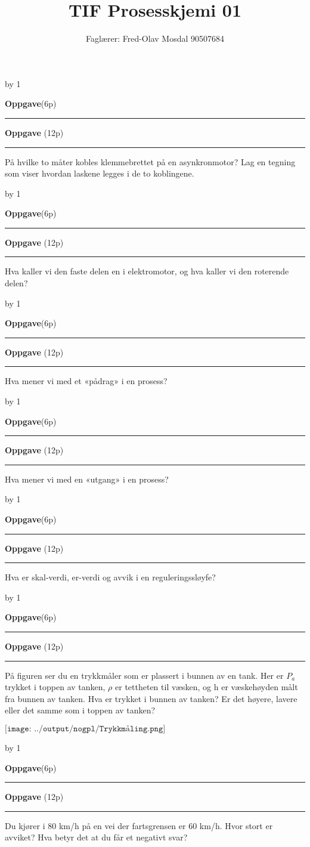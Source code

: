 \documentclass[12pt,a4paper]{article}
\def\oppgave{
            \advance\questnum by 1
	    \ifthenelse{\questnum>0\AND \questnum<9}
	    {
                \vskip 1cm
		\textbf{Oppgave}\hskip 5pt\the\questnum \hfill \hfill(6p)
		\vskip 3pt
		\hrule
	\vskip 0.5cm}
	{
                \vskip 1cm
		\textbf{Oppgave}\hskip 5pt \the\questnum \hfill \hfill(12p)
		\vskip 3pt \hrule \vskip 0.5cm }

		}
\begin{document}
\title{TIF Prosesskjemi 01}
\author{Faglærer: Fred-Olav Mosdal 90507684\\}
\maketitle
\oppgave{}%
\vskip 2.5pt 
På hvilke to måter kobles klemmebrettet på en asynkronmotor? Lag en tegning som viser hvordan laskene legges i de to koblingene. 
\vskip 5pt 
\vskip 2.5pt 

\oppgave{}%
\vskip 2.5pt 
Hva kaller vi den faste delen en i elektromotor, og hva kaller vi den roterende delen?
\vskip 5pt 
\vskip 2.5pt 
\newpage
\oppgave{}%
\vskip 2.5pt 
Hva mener vi med et «pådrag» i en prosess?
\vskip 5pt 
\vskip 2.5pt 
\oppgave{}%
\vskip 2.5pt 
Hva mener vi med en «utgang» i en prosess?
\vskip 5pt 
\vskip 2.5pt 
\newpage
\oppgave{}%
\vskip 2.5pt 
Hva er skal-verdi, er-verdi og avvik i en reguleringssløyfe?
\vskip 5pt 
\vskip 2.5pt 
\oppgave{}%
\vskip 2.5pt 
På figuren ser du en trykkmåler som er plassert i bunnen av en tank. Her er $P_a$ trykket i toppen av tanken, $\rho$ er tettheten til væsken, og h er væskehøyden målt fra bunnen av tanken. Hva er trykket i bunnen av tanken? Er det høyere, lavere eller det samme som i toppen av tanken?\\
\vskip 5pt 
$\texttt{[image: ../output/nogpl/Trykkmåling.png]}$
\vskip 5pt 
\vskip 2.5pt 
\newpage
\oppgave{}%
\vskip 2.5pt 
Du kjører i 80 km/h på en vei der fartsgrensen er 60 km/h. Hvor stort er avviket? Hva betyr det at du får et negativt svar?
\end{document}
